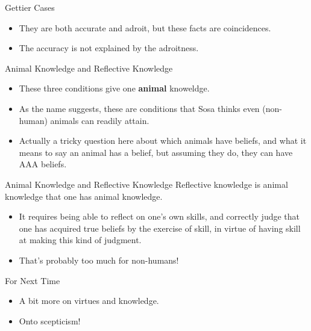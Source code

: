 \documentclass[
  17pt,
  letterpaper,
  ignorenonframetext,
  aspectratio=169,
]{beamer}
\providecommand{\tightlist}{%
  \setlength{\itemsep}{0pt}\setlength{\parskip}{0pt}}\usepackage{longtable,booktabs,array}
\begin{document}
\begin{frame}{Gettier Cases}
\protect\hypertarget{gettier-cases}{}
\begin{itemize}[<+->]
\tightlist
\item
  They are both accurate and adroit, but these facts are coincidences.
\item
  The accuracy is not explained by the adroitness.
\end{itemize}
\end{frame}

\begin{frame}{Animal Knowledge and Reflective Knowledge}
\protect\hypertarget{animal-knowledge-and-reflective-knowledge}{}
\begin{itemize}[<+->]
\tightlist
\item
  These three conditions give one \textbf{animal} knoweldge.
\item
  As the name suggests, these are conditions that Sosa thinks even
  (non-human) animals can readily attain.
\item
  Actually a tricky question here about which animals have beliefs, and
  what it means to say an animal has a belief, but assuming they do,
  they can have AAA beliefs.
\end{itemize}
\end{frame}

\begin{frame}{Animal Knowledge and Reflective Knowledge}
\protect\hypertarget{animal-knowledge-and-reflective-knowledge-1}{}
Reflective knowledge is animal knowledge that one has animal knowledge.

\begin{itemize}[<+->]
\tightlist
\item
  It requires being able to reflect on one's own skills, and correctly
  judge that one has acquired true beliefs by the exercise of skill, in
  virtue of having skill at making this kind of judgment.
\item
  That's probably too much for non-humans!
\end{itemize}
\end{frame}

\begin{frame}{For Next Time}
\protect\hypertarget{for-next-time}{}
\begin{itemize}[<+->]
\tightlist
\item
  A bit more on virtues and knowledge.
\item
  Onto scepticism!
\end{itemize}
\end{frame}
\end{document}
